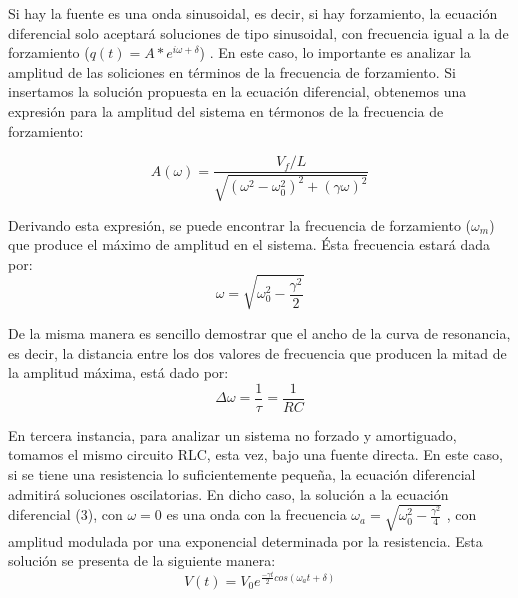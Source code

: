 \documentclass[%
 reprint,
 amsmath,amssymb,
 aps,
]{revtex4-1}
\begin{document}
Si hay la fuente es una onda sinusoidal, es decir, si hay forzamiento, la ecuación diferencial solo aceptará soluciones de tipo sinusoidal, con frecuencia igual a la de forzamiento ($q(t) = A*e^{i\omega + \delta}$) . En este caso, lo importante es analizar la amplitud de las soliciones en t\'erminos de la frecuencia de forzamiento. Si insertamos la soluci\'on propuesta en la ecuaci\'on diferencial, obtenemos una expresión para la amplitud del sistema en t\'ermonos de la frecuencia de forzamiento:

\begin{equation}
A(\omega) = \frac{V_f/L}{\sqrt{(\omega^2 - \omega_0^2)^2 + (\gamma\omega)^2}}
\end{equation}

Derivando esta expresi\'on, se puede encontrar la frecuencia de forzamiento ($\omega_m$) que produce el m\'aximo de amplitud en el sistema. \'Esta frecuencia estar\'a dada por:\\

\begin{equation}
\omega = \sqrt{\omega_0^2 - \frac{\gamma^2}{2} }
\end{equation}

De la misma manera es sencillo demostrar que el ancho de la curva de resonancia, es decir, la distancia entre los dos valores de frecuencia que producen la mitad de la amplitud m\'axima, est\'a dado por:\\

\begin{equation}
\Delta\omega = \frac{1}{\tau} = \frac{1}{RC}
\end{equation}

En tercera instancia, para analizar un sistema no forzado y amortiguado, tomamos el mismo circuito RLC, esta vez, bajo una fuente directa. En este caso, si se tiene una resistencia lo suficientemente pequeña, la ecuaci\'on diferencial admitir\'a soluciones oscilatorias. En dicho caso, la solución a la ecuaci\'on diferencial (3), con $\omega = 0$  es una onda con la frecuencia $\omega_a = \sqrt{\omega_0^2 -\frac{\gamma^2}{4}}$ , con amplitud modulada por una exponencial determinada por la resistencia. Esta soluci\'on se presenta de la siguiente manera:\\

\begin{equation}
V(t) = V_0 e^{\frac{-\gamma t}{2}cos(\omega_a t + \delta)}
\end{equation}
\end{document}

